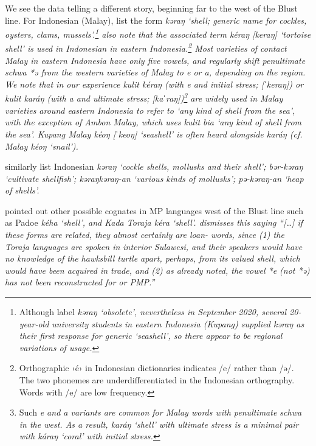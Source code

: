 We see the data telling a different story,
beginning far to the west of the Blust line.
For Indonesian (Malay), 
\citet{StevensSchmidgall-Tellings2010} list the form \it{kəraŋ}
‘shell; generic name for cockles,
oysters, clams, mussels’.\footnote{
		Although \citet{StevensSchmidgall-Tellings2010} label \it{kəraŋ} ‘obsolete’,
		nevertheless in September 2020,
		several 20-year-old university students in eastern Indonesia
		(Kupang) supplied \it{kəraŋ} as their first response for generic
		‘seashell’, so there appear to be regional variations of usage.}
\citet{StevensSchmidgall-Tellings2010} also note that the associated
term \it{kéraŋ} [keraŋ] ‘tortoise shell’ is used in Indonesian
in eastern Indonesia.\footnote{
		Orthographic ‹é› in Indonesian
		dictionaries indicates /e/ rather than /ə/.
		The two phonemes are underdifferentiated in the Indonesian orthography.
		Words with /e/ are low frequency.}
Most varieties of contact Malay
in eastern Indonesia have only five vowels,
and regularly shift penultimate schwa *ə from the western varieties
of Malay to \it{e} or \it{a},
depending on the region.
We note that in our experience \it{kulit kéraŋ} (with \it{e}
and initial stress; [ˈkeraŋ]) or \it{kulit karáŋ} (with \it{a}
and ultimate stress; [kaˈraŋ])\footnote{
		Such \it{e}
		and \it{a} variants are common for Malay words with penultimate
		schwa in the west.
		As a result, \it{karáŋ} ‘shell’ with ultimate stress is a minimal
		pair with \it{káraŋ} ‘coral’ with initial stress.}
are widely
used in Malay varieties around eastern Indonesia to refer to
‘any kind of shell from the sea’,
with the exception of Ambon Malay,
which uses \it{kulit bia} ‘any kind of shell from the sea’.
Kupang Malay \it{kéoŋ} [ˈkeoŋ] ‘seashell’ is often heard alongside
\it{karáŋ} (cf. Malay \it{kéoŋ} ‘snail’).

\citet{EcholsWolff1989} similarly list Indonesian \it{kəraŋ}
‘cockle shells, mollusks and their shell’; \it{bər-kəraŋ} ‘cultivate shellfish’;
\it{kəraŋ{\tl}kəraŋ-an} ‘various kinds of mollusks’; \it{pə-kəraŋ-an} ‘heap of shells’.

\citet{Nothofer1992} pointed out other possible cognates in MP
languages west of the Blust line such as Padoe \it{kéha} ‘shell’,
and Kada Toraja \it{kéra} ‘shell’.
\citet[46]{Blust2009} dismisses this saying
“[\ldots] if these forms are related, they almost certainly are loan-
words, since (1) the Toraja languages are spoken in interior Sulawesi, and their speakers
would have no knowledge of the hawksbill turtle apart, perhaps, from its valued shell,
which would have been acquired in trade, and (2) as already noted, the vowel *e (not *ə)
has not been reconstructed for  or PMP.”
 


